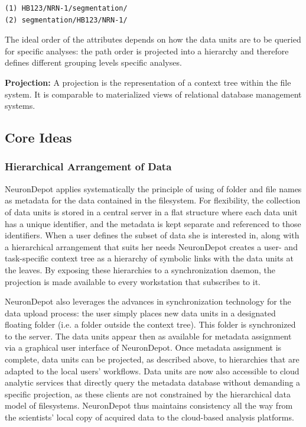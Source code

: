 \documentclass{frontiersSCNS} %
\begin{document}
\begin{lstlisting}[style=display]
(1) HB123/NRN-1/segmentation/
(2) segmentation/HB123/NRN-1/
\end{lstlisting}


The ideal order of the attributes depends on how the data units are to be
queried for specific analyses: the path order is projected into a hierarchy and
therefore defines different grouping levels specific analyses.


\textbf{Projection:} A projection is the representation of a context tree
within the file system. It is comparable to materialized views of relational
database management systems.

\subsection{Core Ideas}
\subsubsection{Hierarchical Arrangement of Data}

NeuronDepot applies systematically the principle of using of folder and file
names as metadata for the data contained in the filesystem. For flexibility,
the collection of data units is stored in a central server in a flat structure
where each data unit has a unique identifier, and the metadata is kept separate
and referenced to those identifiers. When a user defines the subset of data she
is interested in, along with a hierarchical arrangement that suits her needs
NeuronDepot creates a user- and task-specific context tree as a hierarchy of
symbolic links with the data units at the leaves. By exposing these
hierarchies to a synchronization daemon, the projection is made available to
every workstation that subscribes to it.

NeuronDepot also leverages the advances in synchronization technology for the
data upload process: the user simply places new data units in a designated
floating folder (i.e. a folder outside the context tree). This folder is
synchronized to the server. The data units appear then as available for
metadata assignment via a graphical user interface of NeuronDepot. Once
metadata assignment is complete, data units can be projected, as described
above, to hierarchies that are adapted to the local users' workflows. Data
units are now also accessible to cloud analytic services that directly query
the metadata database without demanding a specific projection, as these clients
are not constrained by the hierarchical data model of filesystems. NeuronDepot
thus maintains consistency all the way from the scientists' local copy of
acquired data to the cloud-based analysis platforms.
\end{document}
